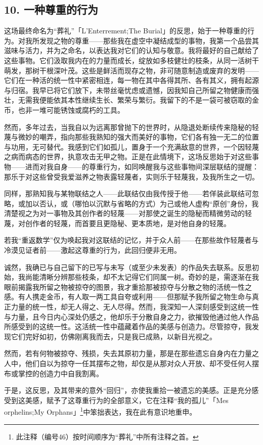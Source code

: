 \subsection{10. 一种尊重的行为}

这场最终命名为“葬礼”「L'Enterrement;The Burial」的反思，始于一种尊重的行为。对我所发现之物的尊重——那些我在虚空中凝结成型的事物，我第一个品尝其滋味与活力，并为之命名，以表达我对它们的认知与敬意。我将最好的自己献给了这些事物。它们汲取我内在的力量而成长，绽放如多枝健壮的枝条，从同一活树干萌发，那树干根深叶茂。这些是鲜活而现存之物，非可随意制造或废弃的发明——它们在一种活的统一性中紧密相连，每一物在其中各得其所、各有其义，拥有起源与归宿。我早已将它们放下，未带丝毫忧虑或遗憾，因我知自己所留之物健康而强壮，无需我便能依其本性继续生长、繁荣与繁衍。我留下的不是一袋可被窃取的金币，也非一堆可能锈蚀或腐朽的工具。

然而，多年过去，当我自以为远离那曾抛下的世界时，从隐退处断续传来隐秘的轻蔑与微妙的嘲弄，指向那些我熟知的强大而美好的事物，它们各有独一无二的位置与功用，无可替代。我感到它们如孤儿，置身于一个充满敌意的世界，一个因轻蔑之病而病态的世界，执意攻击无甲之物。正是在此情境下，这场反思始于对这些事物——进而对我自身——的尊重行为，如同唤醒我与这些事物间深层联结的提醒：那乐于对这些曾受我爱滋养之物表露轻蔑者，实则乐于轻蔑我，及我所生之一切。

同样，那熟知我与某物联结之人——此联结仅由我传授于他——若佯装此联结可忽略，或加以否认，或（哪怕以沉默与省略的方式）为己或他人虚构“原创”身份，我清楚视之为对一事物及其创作者的轻蔑——对那使之诞生的隐秘而精微劳动的轻蔑，对创作者的轻蔑，而首要且更隐秘、更本质地，是对他自身的轻蔑。

若我“重返数学”仅为唤起我对这联结的记忆，并于众人前——在那些故作轻蔑者与冷漠见证者前——激起这尊重的行为，此回归便非无用。

诚然，我确已与自己留下的已写与未写（或至少未发表）的作品失去联系。反思初始，我尚能清晰分辨那些枝条，却不太记得它们同属一树。奇妙的是，需逐渐在我眼前揭露我所留之物被掠夺的图景，我才重拾那被掠夺与分散之物的活统一性之感。有人携走金币，有人取一两工具自夸或利用——但那赋予我所留之物生命与真正力量的统一性，却无人得之、无人尽得。然而，我深知一人深刻感受到这统一性与力量，且今日内心深处仍感之，他却乐于分散自身之力，欲摧毁他通过他人作品所感受到的这统一性。这活统一性中蕴藏着作品的美感与创造力。尽管掠夺，我发现它们完好如初，仿佛刚离我而去，只是我已成熟，以新目光视之。

然而，若有何物被掠夺、残损，失去其原初力量，那是在那些遗忘自身内在力量之人中，他们自以为掠夺一任其摆布之物，却仅是从那对众人开放、却不受任何人摆布或掌控的创造力中自我割离。

于是，这反思，及其带来的意外“回归”，亦使我重拾一被遗忘的美感。正是充分感受到这美感，赋予了这尊重行为的全部意义，它在注释“我的孤儿”「Mes orphelins;My Orphans」\footnote{此注释（编号46）按时间顺序为“葬礼”中所有注释之首。}中笨拙表达，我在此有意识地重申。